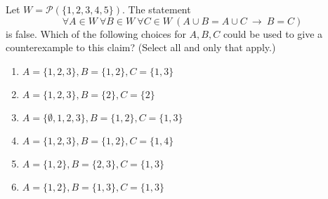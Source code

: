 
Let $W =  \mathcal{P}(\{1,2,3,4,5\})$.
The statement $$\forall A \in W~ \forall B\in W~ \forall  C  \in W~  ( A \cup B =  A \cup C ~\to~  B = C) $$ is false.
Which of the following  choices for  $A, B, C$ could  
be used to  give a counterexample to this claim?
(Select all and only that  apply.)
\begin{enumerate}
    \item $A = \{ 1, 2, 3 \}, B = \{ 1, 2\}, C= \{1, 3\}$
    \item $A = \{ 1, 2, 3 \}, B = \{ 2\}, C= \{2\}$
    \item $A = \{ \emptyset, 1, 2, 3 \}, B = \{ 1, 2\}, C= \{1, 3\}$
    \item $A = \{ 1, 2, 3 \}, B = \{ 1, 2\}, C= \{1, 4\}$
    \item $A = \{ 1, 2 \}, B = \{ 2, 3\}, C= \{1, 3\}$
    \item $A = \{ 1,2 \}, B =  \{ 1,3\}, C =  \{ 1,3\}$
\end{enumerate}